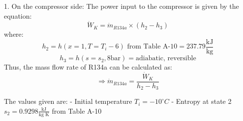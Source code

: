 1. On the compressor side:
The power input to the compressor is given by the equation:
\[ \dot{W}_K = \dot{m}_{R134a} \times (h_2 - h_3) \]
where:
\[ h_2 = h(x = 1, T = T_i - 6) \text{ from Table A-10} = 237.79 \frac{\text{kJ}}{\text{kg}} \]
\[ h_3 = h(s = s_2, 8 \text{bar}) = \text{adiabatic, reversible} \]
Thus, the mass flow rate of R134a can be calculated as:
\[ \Rightarrow \dot{m}_{R134a} = \frac{\dot{W}_K}{h_2 - h_3} \]

The values given are:
- Initial temperature \( T_i = -10^\circ C \)
- Entropy at state 2 \( s_2 = 0.9298 \frac{\text{kJ}}{\text{kg K}} \) from Table A-10